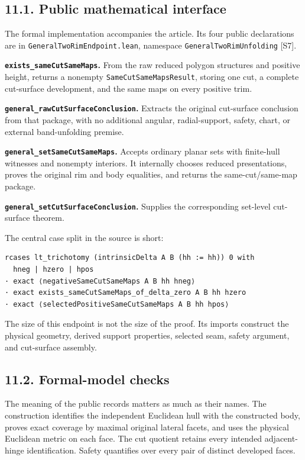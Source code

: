 \documentclass[
  11pt,
  letterpaper,
]{article}
\begin{document}
\subsection{11.1. Public mathematical
interface}\label{public-mathematical-interface}

The formal implementation accompanies the article. Its four public
declarations are in \texttt{GeneralTwoRimEndpoint.lean}, namespace
\texttt{GeneralTwoRimUnfolding} {[}S7{]}.

\textbf{\texttt{exists\_sameCutSameMaps}.} From the raw reduced polygon
structures and positive height, returns a nonempty
\texttt{SameCutSameMapsResult}, storing one cut, a complete cut-surface
development, and the same maps on every positive trim.

\textbf{\texttt{general\_rawCutSurfaceConclusion}.} Extracts the
original cut-surface conclusion from that package, with no additional
angular, radial-support, safety, chart, or external band-unfolding
premise.

\textbf{\texttt{general\_setSameCutSameMaps}.} Accepts ordinary planar
sets with finite-hull witnesses and nonempty interiors. It internally
chooses reduced presentations, proves the original rim and body
equalities, and returns the same-cut/same-map package.

\textbf{\texttt{general\_setCutSurfaceConclusion}.} Supplies the
corresponding set-level cut-surface theorem.

The central case split in the source is short:

\begin{verbatim}
rcases lt_trichotomy (intrinsicDelta A B (hh := hh)) 0 with
  hneg | hzero | hpos
· exact ⟨negativeSameCutSameMaps A B hh hneg⟩
· exact exists_sameCutSameMaps_of_delta_zero A B hh hzero
· exact ⟨selectedPositiveSameCutSameMaps A B hh hpos⟩
\end{verbatim}

The size of this endpoint is not the size of the proof. Its imports
construct the physical geometry, derived support properties, selected
seam, safety argument, and cut-surface assembly.

\subsection{11.2. Formal-model checks}\label{formal-model-checks}

The meaning of the public records matters as much as their names. The
construction identifies the independent Euclidean hull with the
constructed body, proves exact coverage by maximal original lateral
facets, and uses the physical Euclidean metric on each face. The cut
quotient retains every intended adjacent-hinge identification. Safety
quantifies over every pair of distinct developed faces.
\end{document}
